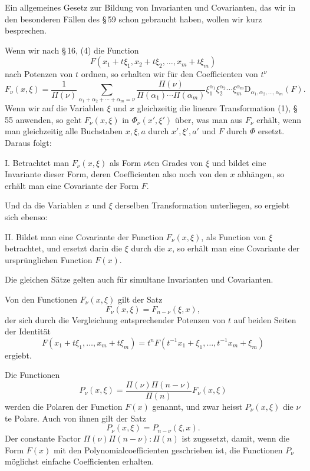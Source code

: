 \documentclass[11pt]{article}
\newcommand{\D}{\mathrm D}
\begin{document}
Ein allgemeines Gesetz zur Bildung von Invarianten und Covarianten, das wir in den besonderen Fällen des \S\,59 schon gebraucht haben, wollen wir kurz besprechen.

Wenn wir nach \S\,16, (4) die Function
\[
 F(x_1+t\xi_1,x_2+t\xi_2,
 \ldots,x_m+t\xi_m)
\]
nach Potenzen von $t$ ordnen, so erhalten wir für den Coefficienten von $t^\nu$
\begin{equation}
 F_\nu(x,\xi)=\frac1{\Pi(\nu)}
 \sum_{\alpha_1+\alpha_2+\cdots+\alpha_m=\nu}
 \frac{\Pi(\nu)}{\Pi(\alpha_1)\cdots\Pi(\alpha_m)}
 \xi_1^{\alpha_1}\xi_2^{\alpha_2}\cdots\xi_m^{\alpha_m}
 \D_{\alpha_1,\alpha_2,\ldots,\alpha_m}(F).
\tag{4}
\end{equation}
Wenn wir auf die Variablen $\xi$ und $x$ gleichzeitig die lineare Transformation (1), \S\,55 anwenden, so geht $F_\nu(x,\xi)$ in $\Phi_\nu(x',\xi')$ über, was man aus $F_\nu$ erhält, wenn man gleichzeitig alle Buchstaben $x,\xi,a$ durch $x',\xi',a'$ und $F$ durch $\Phi$ ersetzt. Daraus folgt:

I. Betrachtet man $F_\nu(x,\xi)$ als Form $\nu$ten Grades von $\xi$ und bildet eine Invariante dieser Form, deren Coefficienten also noch von den $x$ abhängen, so erhält man eine Covariante der Form $F$.

Und da die Variablen $x$ und $\xi$ derselben Transformation unterliegen, so ergiebt sich ebenso:

II. Bildet man eine Covariante der Function $F_\nu(x,\xi)$, als Function von $\xi$ betrachtet, und ersetzt darin die $\xi$ durch die $x$, so erhält man eine Covariante der ursprünglichen Function $F(x)$.

Die gleichen Sätze gelten auch für simultane Invarianten und Covarianten.

Von den Functionen $F_\nu(x,\xi)$ gilt der Satz
\begin{equation}
 F_\nu(x,\xi)=F_{n-\nu}(\xi,x),
\tag{5}
\end{equation}
der sich durch die Vergleichung entsprechender Potenzen von $t$ auf beiden Seiten der Identität
\[
 F(x_1+t\xi_1,\ldots,x_m+t\xi_m)=t^nF(t^{-1}x_1+\xi_1,\ldots,t^{-1}x_m+\xi_m)
\]
ergiebt.

Die Functionen
\[
 P_\nu(x,\xi)=\frac{\Pi(\nu)\Pi(n-\nu)}{\Pi(n)}F_\nu(x,\xi)
\]
werden die Polaren der Function $F(x)$ genannt, und zwar heisst $P_\nu(x,\xi)$ die $\nu$te Polare. Auch von ihnen gilt der Satz
\[
 P_\nu(x,\xi)=P_{n-\nu}(\xi,x).
\]
Der constante Factor $\Pi(\nu)\Pi(n-\nu):\Pi(n)$ ist zugesetzt, damit, wenn die Form $F(x)$ mit den Polynomialcoefficienten geschrieben ist, die Functionen $P_\nu$ möglichst einfache Coefficienten erhalten.
\end{document}
